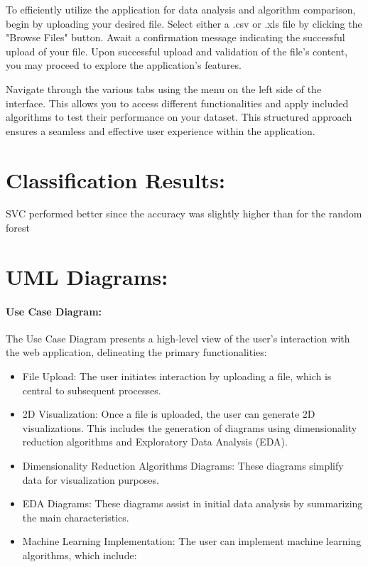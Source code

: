 \documentclass[unnumsec,webpdf,contemporary,large]{oup-authoring-template}%
\theoremstyle{thmstyleone}%
\theoremstyle{thmstyletwo}%
\theoremstyle{thmstylethree}%
\begin{document}
To efficiently utilize the application for data analysis and algorithm comparison, begin by uploading your desired file. Select either a .csv or .xls file by clicking the "Browse Files" button. Await a confirmation message indicating the successful upload of your file. Upon successful upload and validation of the file's content, you may proceed to explore the application's features.
\vspace{0.2cm}

Navigate through the various tabs using the menu on the left side of the interface. This allows you to access different functionalities and apply included algorithms to test their performance on your dataset. This structured approach ensures a seamless and effective user experience within the application.


\section{Classification Results:}\label{sec3}
\vspace{0.2cm}

SVC performed better since the accuracy was slightly higher than for the random forest
\vspace{0.2cm}

\section{UML Diagrams:}\label{sec3}
\vspace{0.2cm}

\paragraph{Use Case Diagram:}
\vspace{0.2cm}

The Use Case Diagram presents a high-level view of the user's interaction with the web application, delineating the primary functionalities:
\vspace{0.2cm}

\begin{itemize}
    \item File Upload: The user initiates interaction by uploading a file, which is central to subsequent processes.
    \vspace{0.2cm}
    \item 2D Visualization: Once a file is uploaded, the user can generate 2D visualizations. This includes the generation of diagrams using dimensionality reduction algorithms and Exploratory Data Analysis (EDA).
    \vspace{0.2cm}
    \item Dimensionality Reduction Algorithms Diagrams: These diagrams simplify data for visualization purposes.
    \vspace{0.2cm}
    \item EDA Diagrams: These diagrams assist in initial data analysis by summarizing the main characteristics.
    \vspace{0.2cm}
    \item Machine Learning Implementation: The user can implement machine learning algorithms, which include:
\end{itemize}
\end{document}
